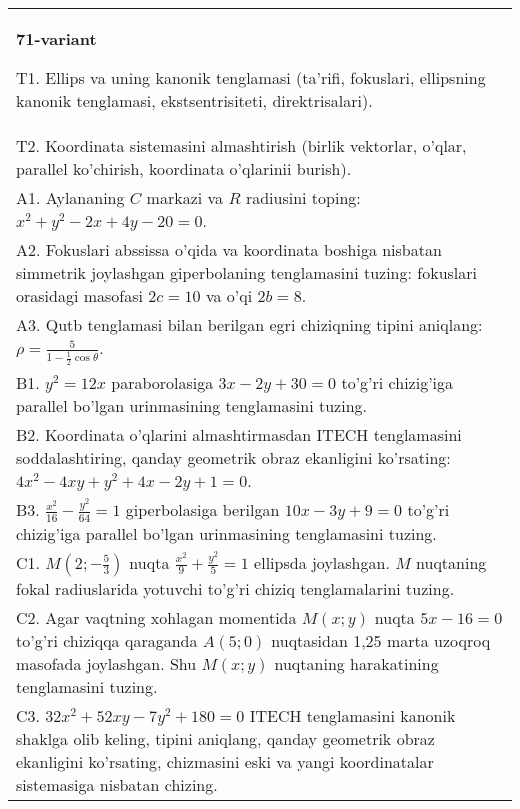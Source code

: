 \documentclass{article}
\begin{document}
\begin{tabular}{m{17cm}}
\textbf{71-variant}
\newline

T1. Ellips va uning kanonik tenglamasi (ta'rifi, fokuslari, ellipsning kanonik tenglamasi, ekstsentrisiteti, direktrisalari).\\

T2. Koordinata sistemasini almashtirish (birlik vektorlar, o'qlar, parallel ko'chirish, koordinata o'qlarinii burish).\\

A1. Aylananing $C$ markazi va $R$ radiusini toping: $x^2+y^2-2x+4y-20=0$.\\

A2. Fokuslari abssissa o'qida va koordinata boshiga nisbatan simmetrik joylashgan giperbolaning tenglamasini tuzing: fokuslari orasidagi masofasi $2c=10$ va o'qi $2b=8$.\\

A3. Qutb tenglamasi bilan berilgan egri chiziqning tipini aniqlang: $\rho=\frac{5}{1-\frac{1}{2}\cos\theta}$.\\

B1. $y^{2} = 12x$ paraborolasiga $3x - 2y + 30 = 0$ to'g'ri chizig'iga parallel bo'lgan urinmasining tenglamasini tuzing.  \\

B2. Koordinata o'qlarini almashtirmasdan ITECH tenglamasini soddalashtiring, qanday geometrik obraz ekanligini ko'rsating: $4x^{2} - 4xy + y^{2} + 4x - 2y + 1 = 0$.  \\

B3. $\frac{x^{2}}{16} - \frac{y^{2}}{64} = 1$ giperbolasiga berilgan $10x - 3y + 9 = 0$ to'g'ri chizig'iga parallel bo'lgan urinmasining tenglamasini tuzing.  \\

C1. $M(2; - \frac{5}{3})$ nuqta $\frac{x^{2}}{9} + \frac{y^{2}}{5} = 1$ ellipsda joylashgan. $M$ nuqtaning fokal radiuslarida yotuvchi to'g'ri chiziq tenglamalarini tuzing.  \\

C2. Agar vaqtning xohlagan momentida $M(x;y)$ nuqta $5x - 16 = 0$ to'g'ri chiziqqa qaraganda $A(5;0)$ nuqtasidan 1,25 marta uzoqroq masofada joylashgan. Shu $M(x;y)$ nuqtaning harakatining tenglamasini tuzing.  \\

C3. $32x^{2} + 52xy - 7y^{2} + 180 = 0$ ITECH tenglamasini kanonik shaklga olib keling, tipini aniqlang, qanday geometrik obraz ekanligini ko'rsating, chizmasini eski va yangi koordinatalar sistemasiga nisbatan chizing.  \\

\end{tabular}
\vspace{1cm}
\end{document}
